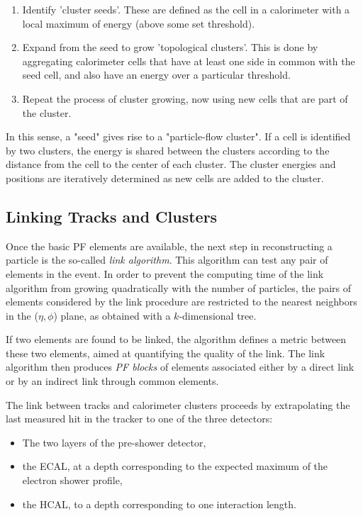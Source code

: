 \begin{enumerate}
	\item Identify 'cluster seeds'. These are defined as the cell in a calorimeter with a local maximum of energy (above some set threshold).
	\item Expand from the seed to grow 'topological clusters'. This is done by aggregating calorimeter cells that have at least one side in common with the seed cell, and also have an energy over a particular threshold.
	\item Repeat the process of cluster growing, now using new cells that are part of the cluster.
\end{enumerate}

In this sense, a "seed" gives rise to a "particle-flow cluster". If a cell is identified by two clusters, the energy is shared between the clusters according to the distance from the cell to the center of each cluster. The cluster energies and positions are iteratively determined as new cells are added to the cluster.

\subsection{Linking Tracks and Clusters}
Once the basic PF elements are available, the next step in reconstructing a particle is the so-called \textit{link algorithm}. This algorithm can test any pair of elements in the event. In order to prevent the computing time of the link algorithm from growing quadratically with the number of particles, the pairs of elements considered by the link procedure are restricted to the nearest neighbors in the ($\eta,\phi$) plane, as obtained with a $k$-dimensional tree\cite{Bentley1975MultidimensionalBS}. 

 If two elements are found to be linked, the algorithm defines a metric between these two elements, aimed at quantifying the quality of the link. The link algorithm then produces \textit{PF blocks} of elements associated either by a direct link or by an indirect link through common elements.

 The link between tracks and calorimeter clusters proceeds by extrapolating the last measured hit in the tracker to one of the three detectors\cite{CMS:2009nxa}:

 \begin{itemize}
 	\item The two layers of the pre-shower detector,
 	\item the ECAL, at a depth corresponding to the expected maximum of the electron shower profile,
 	\item the HCAL, to a depth corresponding to one interaction length.
 \end{itemize}

